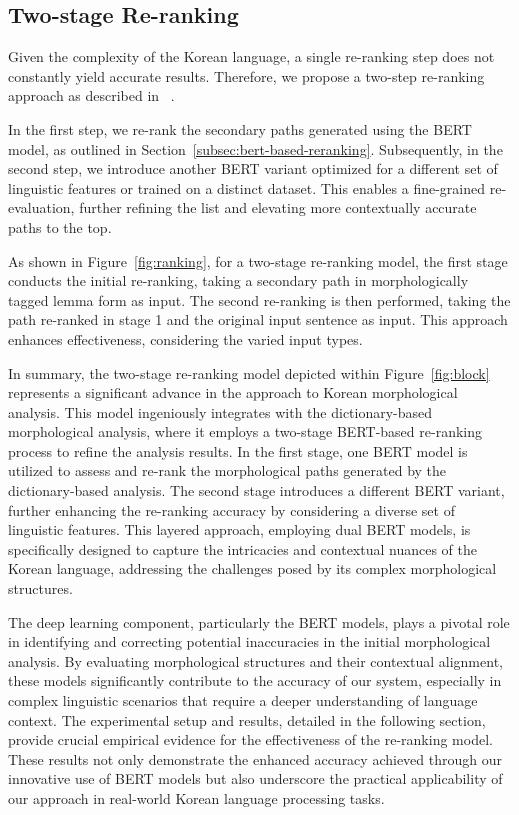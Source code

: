 \documentclass[AMS,STIX2COL]{WileyNJD-v2}
\begin{document}
    \subsection{Two-stage Re-ranking}\label{subsec:two-stage-reranking}

    Given the complexity of the Korean language, a single re-ranking step does not constantly yield accurate results.
    Therefore, we propose a two-step re-ranking approach as described in ~\cite{Nogueira2019}.

    In the first step, we re-rank the secondary paths generated using the BERT model, as outlined in Section~\ref{subsec:bert-based-reranking}.
    Subsequently, in the second step, we introduce another BERT variant optimized for a different set of linguistic features or trained on a distinct dataset.
    This enables a fine-grained re-evaluation, further refining the list and elevating more contextually accurate paths to the top.

    As shown in Figure~\ref{fig:ranking}, for a two-stage re-ranking model, the first stage conducts the initial re-ranking, taking a secondary path in morphologically tagged lemma form as input.
    The second re-ranking is then performed, taking the path re-ranked in stage 1 and the original input sentence as input.
    This approach enhances effectiveness, considering the varied input types.

    In summary, the two-stage re-ranking model depicted within Figure~\ref{fig:block} represents a significant advance in the approach to Korean morphological analysis.
    This model ingeniously integrates with the dictionary-based morphological analysis, where it employs a two-stage BERT-based re-ranking process to refine the analysis results.
    In the first stage, one BERT model is utilized to assess and re-rank the morphological paths generated by the dictionary-based analysis.
    The second stage introduces a different BERT variant, further enhancing the re-ranking accuracy by considering a diverse set of linguistic features.
    This layered approach, employing dual BERT models, is specifically designed to capture the intricacies and contextual nuances of the Korean language, addressing the challenges posed by its complex morphological structures.

    The deep learning component, particularly the BERT models, plays a pivotal role in identifying and correcting potential inaccuracies in the initial morphological analysis.
    By evaluating morphological structures and their contextual alignment, these models significantly contribute to the accuracy of our system, especially in complex linguistic scenarios that require a deeper understanding of language context.
    The experimental setup and results, detailed in the following section, provide crucial empirical evidence for the effectiveness of the re-ranking model.
    These results not only demonstrate the enhanced accuracy achieved through our innovative use of BERT models but also underscore the practical applicability of our approach in real-world Korean language processing tasks.
\end{document}
